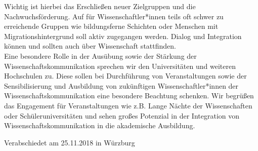 \documentclass[DIV=calc]{scrartcl}
\begin{document}
Wichtig ist hierbei das Erschließen neuer Zielgruppen und die Nachwuchsförderung.
Auf für Wissenschaftler*innen teils oft schwer zu erreichende Gruppen wie bildungsferne Schichten oder Menschen mit Migrationshintergrund soll aktiv zugegangen werden.
Dialog und Integration können und sollten auch über Wissenschaft stattfinden.\\

Eine besondere Rolle in der Ausübung sowie der Stärkung der Wissenschaftskommunikation sprechen wir den Universitäten und weiteren Hochschulen zu.
Diese sollen bei Durchführung von Veranstaltungen sowie der Sensibilisierung und Ausbildung von zukünftigen Wissenschaftler*innen der Wissenschaftskommunikation eine besondere Beachtung schenken.
Wir begrüßen das Engagement für Veranstaltungen wie z.B. Lange Nächte der Wissenschaften oder Schüleruniversitäten und sehen großes Potenzial in der Integration von Wissenschaftskommunikation in die akademische Ausbildung.
\vfill
    \begin{flushright}
        Verabschiedet am 25.11.2018 in Würzburg
    \end{flushright}
\end{document}
